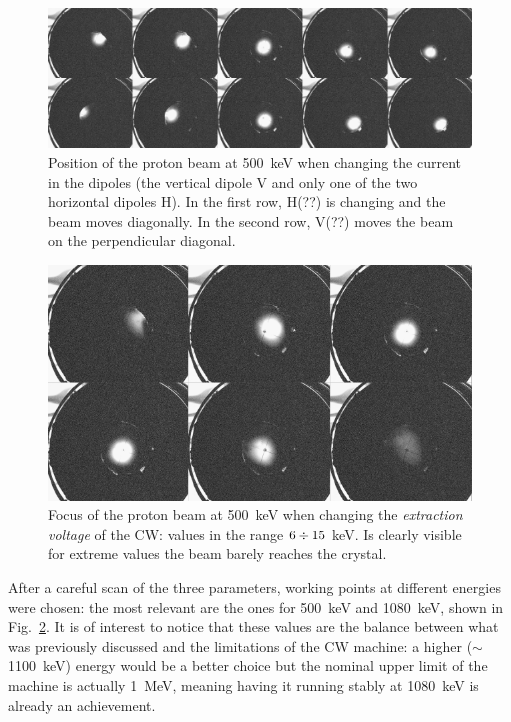 \begin{refsection}
        \begin{figure}
            \centering
            \includegraphics[width = \textwidth]{Figures/MEG/X17/beamtuning/psotion_500keV.png}
            \caption{Position of the proton beam at \SI{500}{keV} when changing the current in the dipoles (the vertical dipole V and only one of the two horizontal dipoles H). In the first row, H(??) is changing and the beam moves diagonally. In the second row, V(??) moves the beam on the perpendicular diagonal.}
            \label{fig:position_500keV}
        \end{figure}
        \begin{figure}
            \centering
            \includegraphics[width = \textwidth]{Figures/MEG/X17/beamtuning/focus_500keV.png}
            \caption{Focus of the proton beam at \SI{500}{keV} when changing the \textit{extraction voltage} of the CW: values in the range $6\divisionsymbol15$ keV. Is clearly visible for extreme values the beam barely reaches the crystal.}
            \label{fig:ocus_500keV}
        \end{figure}
        After a careful scan of the three parameters, working points at different energies were chosen: the most relevant are the ones for \SI{500}{keV} and \SI{1080}{keV}, shown in Fig.~\ref{fig:ocus_500keV}.
        It is of interest to notice that these values are the balance between what was previously discussed and the limitations of the CW machine: a higher ($\sim$\SI{1100}{keV}) energy would be a better choice but the nominal upper limit of the machine is actually \SI{1}{MeV}, meaning having it running stably at \SI{1080}{keV} is already an achievement.


\end{refsection}
